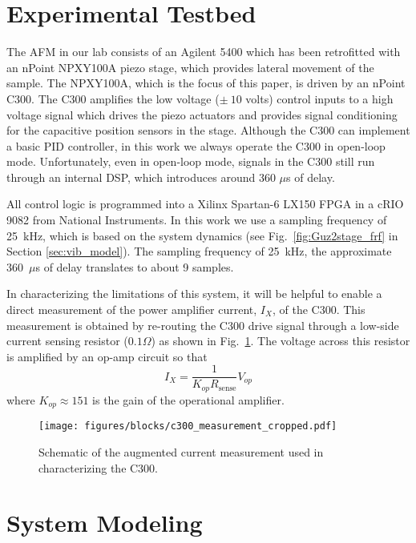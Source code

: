 \documentclass[twocolumn,twoside]{IEEEtran}
\begin{document}
\section{Experimental Testbed}\label{sec:testbed}
The AFM in our lab consists of an Agilent 5400 which has been retrofitted with an nPoint NPXY100A piezo stage, which provides lateral movement of the sample. The NPXY100A, which is the focus of this paper, is driven by an nPoint C300. The C300 amplifies the low voltage ($\pm~10$ volts) control inputs to a high voltage signal which drives the piezo actuators and provides signal conditioning for the capacitive position sensors in the stage. Although the C300 can implement a basic PID controller, in this work we always operate the C300 in open-loop mode. Unfortunately, even in open-loop mode, signals in the C300 still run through an internal DSP, which introduces around 360 $\mu$s of delay. 

All control logic is programmed into a Xilinx Spartan-6 LX150 FPGA in a cRIO 9082 from National Instruments.
In this work we use a sampling frequency of 25~kHz, which is based on the system dynamics (see Fig.~\ref{fig:Guz2stage_frf} in Section \ref{sec:vib_model}). The sampling frequency of 25~kHz, the approximate 360~$\mu$s of delay translates to about 9 samples.

In characterizing the limitations of this system, it will be helpful to enable a direct measurement of the power amplifier current, $I_X$, of the C300. This measurement is obtained by re-routing the C300 drive signal through a low-side current sensing resistor ($0.1\Omega$) as shown in Fig.~\ref{fig:c300_meas}.
The voltage across this resistor is amplified by an op-amp circuit so that
\begin{equation}
I_{X} = \frac{1}{K_{op}R_{\text{sense}}}V_{op}
\end{equation}
where $K_{op}\approx 151$ is the gain of the operational amplifier.


\begin{figure}
    \texttt{[image: figures/blocks/c300\_measurement\_cropped.pdf]}
    \caption{Schematic of the augmented current measurement used in characterizing the C300.}
    \label{fig:c300_meas}
\end{figure}
\section{System Modeling}
\end{document}
